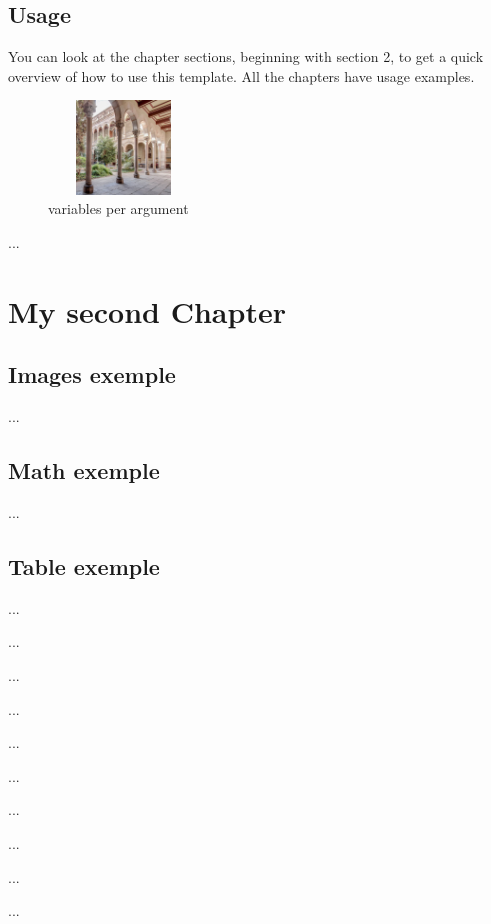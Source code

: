 \documentclass[a4paper, 12pt, oneside, times, print, NoDraft]{template/UBtemplate}
\begin{document}
\section{Usage}

You can look at the chapter sections, beginning with section 2, to get a quick overview of how to use this template. All the chapters have usage examples.    


\begin{figure}[H]
    \centering
    \includegraphics[width=4cm, height=2.5cm]{images/edifici-historic-universitat-de-barcelona.jpg}
    \caption{variables per argument}
    \label{taula}
\end{figure}%


...






\chapter{My second Chapter}


\section{Images exemple}

...

\section{Math exemple}

...

\section{Table exemple}

...

...

...

...

...

...

...

...

...

...
\end{document}
